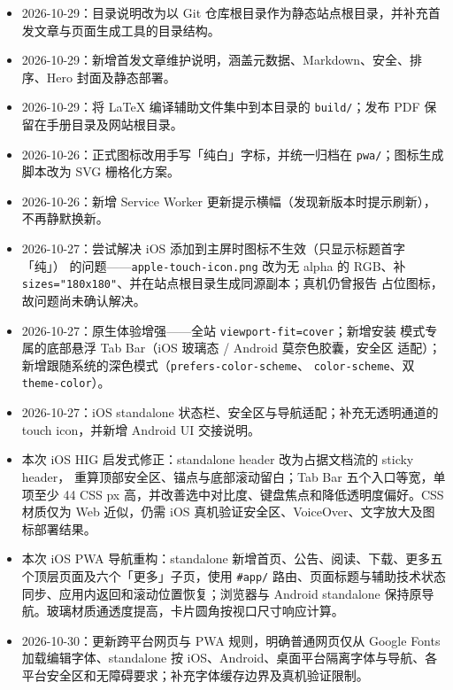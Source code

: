 \documentclass[fontset=fandol]{ctexrep}
\begin{document}
\begin{itemize}
	\item{2026-10-29：目录说明改为以 Git 仓库根目录作为静态站点根目录，并补充首发文章与页面生成工具的目录结构。}
	\item{2026-10-29：新增首发文章维护说明，涵盖元数据、Markdown、安全、排序、Hero 封面及静态部署。}
	\item{2026-10-29：将 LaTeX 编译辅助文件集中到本目录的 \verb|build/|；发布 PDF 保留在手册目录及网站根目录。}
	\item{2026-10-26：正式图标改用手写「纯白」字标，并统一归档在
	      \verb|pwa/|；图标生成脚本改为 SVG 栅格化方案。}
	\item{2026-10-26：新增 Service Worker 更新提示横幅（发现新版本时提示刷新），
	      不再静默换新。}
	\item{2026-10-27：尝试解决 iOS 添加到主屏时图标不生效（只显示标题首字「纯」）
	      的问题——\verb|apple-touch-icon.png| 改为无 alpha 的 RGB、补
	      \verb|sizes="180x180"|、并在站点根目录生成同源副本；真机仍曾报告
	      占位图标，故问题尚未确认解决。}
	\item{2026-10-27：原生体验增强——全站 \verb|viewport-fit=cover|；新增安装
	      模式专属的底部悬浮 Tab Bar（iOS 玻璃态 / Android 莫奈色胶囊，安全区
	      适配）；新增跟随系统的深色模式（\verb|prefers-color-scheme|、
	      \verb|color-scheme|、双 \verb|theme-color|）。}
	\item{2026-10-27：iOS standalone 状态栏、安全区与导航适配；补充无透明通道的
	      touch icon，并新增 Android UI 交接说明。}
	\item{本次 iOS HIG 启发式修正：standalone header 改为占据文档流的 sticky header，
	      重算顶部安全区、锚点与底部滚动留白；Tab Bar 五个入口等宽，单项至少
	      44 CSS px 高，并改善选中对比度、键盘焦点和降低透明度偏好。CSS 材质仅为
	      Web 近似，仍需 iOS 真机验证安全区、VoiceOver、文字放大及图标部署结果。}
	\item{本次 iOS PWA 导航重构：standalone 新增首页、公告、阅读、下载、更多五个顶层页面及六个「更多」子页，使用 \verb|#app/| 路由、页面标题与辅助技术状态同步、应用内返回和滚动位置恢复；浏览器与 Android standalone 保持原导航。玻璃材质通透度提高，卡片圆角按视口尺寸响应计算。}
	\item{2026-10-30：更新跨平台网页与 PWA 规则，明确普通网页仅从 Google Fonts 加载编辑字体、standalone 按 iOS、Android、桌面平台隔离字体与导航、各平台安全区和无障碍要求；补充字体缓存边界及真机验证限制。}
\end{itemize}
\end{document}
